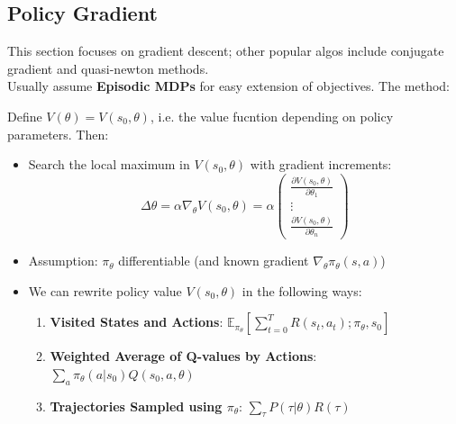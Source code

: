 \documentclass{article}
\begin{document}
\subsection{Policy Gradient}
This section focuses on gradient descent; other popular algos include conjugate gradient and quasi-newton methods.
\\Usually assume \textbf{Episodic MDPs} for easy extension of objectives. The method:
\begin{thmbox}
    Define $V(\theta) = V(s_0, \theta)$, i.e. the value fucntion depending on policy parameters. Then:
    \begin{itemize}
    \item Search the local maximum in $V(s_0, \theta)$ with gradient increments:
        \begin{equation*}
            \Delta \theta = \alpha \nabla_{\theta} V(s_0, \theta) = \alpha
            \begin{pmatrix}
                \frac{\partial V(s_0, \theta)}{\partial \theta_{1}} \\
                \vdots \\
                \frac{\partial V(s_0, \theta)}{\partial \theta_{n}}
            \end{pmatrix}
        \end{equation*}
    \item Assumption: $\pi_{\theta}$ differentiable (and known gradient $\nabla_{\theta} \pi_{\theta}(s, a)$)
    \item We can rewrite policy value $V(s_0, \theta)$ in the following ways:
        \begin{enumerate}
        \item \textbf{Visited States and Actions}: 
            $\mathbb{E}_{\pi_{\theta}} \left[ \sum_{t = 0}^{T} R(s_t, a_t); \pi_{\theta}, s_0 \right]$
        \item \textbf{Weighted Average of Q-values by Actions}:
            $\sum_{a} \pi_{\theta} (a | s_0) Q(s_0, a, \theta)$
        \item \textbf{Trajectories Sampled using $\pi_{\theta}$}: 
            $\sum_{\tau} P(\tau | \theta) R(\tau)$
        \end{enumerate}
    \end{itemize}
\end{thmbox}
\end{document}
